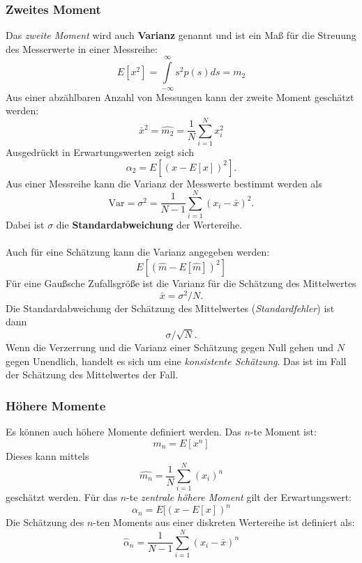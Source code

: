 \subsubsection*{Zweites Moment}
Das \textit{zweite Moment} wird auch \textbf{Varianz} genannt und ist ein Maß für die Streuung des Messerwerte in einer Messreihe:
\begin{equation}
E[x^2]= \int\limits_{-\infty}^{\infty} s^2 p(s) ds=m_2
\end{equation}
Aus einer abzählbaren Anzahl von Messungen kann der zweite Moment geschätzt werden:
\begin{equation}
\bar x^2 = \hat{m_2} = \frac{1}{N}\sum\limits_{i=1}^N x_i^2
\end{equation}
Ausgedrückt in Erwartungswerten zeigt sich
\[
\alpha_2 = E[(x-E[x])^2].
\]
Aus einer Messreihe kann die Varianz der Messwerte bestimmt werden als
\begin{equation}
\mbox{Var} = \sigma^2=\frac{1}{N-1}\sum \limits_{i=1}^N (x_i - \bar x)^2.
\end{equation}
Dabei ist $\sigma$ die \textbf{Standardabweichung} der Wertereihe.\\\\
Auch für eine Schätzung kann die Varianz angegeben werden:
\[
E \left[ (\hat{m}-E[\hat{m}])^2\right]
\]
Für eine Gaußsche Zufallsgröße ist die Varianz für die Schätzung des Mittelwertes
\[
\bar x = \sigma^2/N.
\]
Die Standardabweichung der Schätzung des Mittelwertes (\textit{Standardfehler}) ist dann 
\[
\sigma/\sqrt{N}.
\]
Wenn die Verzerrung und die Varianz einer Schätzung gegen Null gehen und $N$ gegen Unendlich, handelt es sich um eine \textit{konsistente Schätzung}. Das ist im Fall der Schätzung des Mittelwertes der Fall.\\

\subsubsection*{Höhere Momente}
Es können auch höhere Momente definiert werden. Das $n$-te Moment ist:
\[
m_n=E[x^n]
\]
Dieses kann mittels
\[
\hat{m_n}=\frac {1}{N} \sum\limits_{i=1}^N (x_i)^n
\]
geschätzt werden. 
Für das $n$-te \textit{zentrale höhere Moment} gilt der Erwartungswert:
\[
\alpha_n = E[(x-E[x])^n
\]
Die Schätzung des $n$-ten Moments aus einer diskreten Wertereihe ist definiert als:
\begin{equation}
\hat{\alpha}_n=\frac {1}{N-1} \sum_{i=1}^N (x_i - \bar x)^n
\end{equation}

